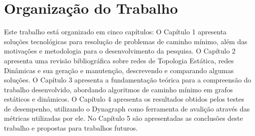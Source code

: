 \section{Organização do Trabalho}

Este trabalho está organizado em cinco capítulos:
O Capítulo 1 apresenta soluções tecnológicas para resolução de problemas de caminho mínimo,
além das motivações e metodologia para o desenvolvimento da pesquisa.
O Capítulo 2 apresenta uma revisão bibliográfica sobre redes de Topologia Estática, redes Dinâmicas e
sua geração e manutenção, descrevendo e comparando algumas soluções.
O Capítulo 3 apresenta a fundamentação teórica para a compreensão do trabalho desenvolvido, abordando
algoritmos de caminho mínimo em grafos estáticos e dinâmicos.
O Capítulo 4 apresenta os resultados obtidos pelos testes de desempenho, utilizando o Dynagraph
como ferramenta de avalição através das métricas utilizadas por ele.
No Capítulo 5 são apresentadas as conclusões deste trabalho e propostas para trabalhos futuros.
